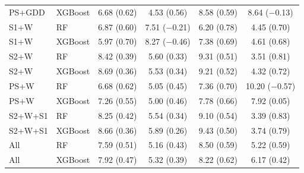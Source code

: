 \begin{table}[htbp]
\begin{tabular}{l l c c c c}
PS+GDD & XGBoost & 6.68 (0.62) & 4.53 (0.56) & 8.58 (0.59) & 8.64 ($-$0.13) \\
S1+W & RF & 6.87 (0.60) & 7.51 ($-$0.21) & 6.20 (0.78) & 4.45 (0.70) \\
S1+W & XGBoost & 5.97 (0.70) & 8.27 ($-$0.46) & 7.38 (0.69) & 4.61 (0.68) \\
S2+W & RF & 8.42 (0.39) & 5.60 (0.33) & 9.31 (0.51) & 3.51 (0.81) \\
S2+W & XGBoost & 8.69 (0.36) & 5.53 (0.34) & 9.21 (0.52) & 4.32 (0.72) \\
PS+W & RF & 6.68 (0.62) & 5.05 (0.45) & 7.36 (0.70) & 10.20 ($-$0.57) \\
PS+W & XGBoost & 7.26 (0.55) & 5.00 (0.46) & 7.78 (0.66) & 7.92 (0.05) \\
S2+W+S1 & RF & 8.25 (0.42) & 5.54 (0.34) & 9.10 (0.54) & 3.39 (0.83) \\
S2+W+S1 & XGBoost & 8.66 (0.36) & 5.89 (0.26) & 9.43 (0.50) & 3.74 (0.79) \\
All & RF & 7.59 (0.51) & 5.16 (0.43) & 8.50 (0.59) & 5.22 (0.59) \\
All & XGBoost & 7.92 (0.47) & 5.32 (0.39) & 8.22 (0.62) & 6.17 (0.42) \\
\bottomrule
\end{tabular}
\end{table}
